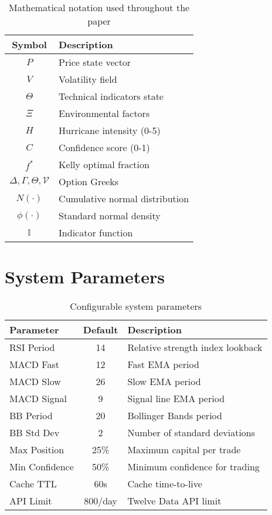 \documentclass[12pt,a4paper]{article}
\begin{document}
\begin{table}[H]
\centering
\begin{tabular}{|c|l|}
\hline
\textbf{Symbol} & \textbf{Description} \\
\hline
$P$ & Price state vector \\
$V$ & Volatility field \\
$\Theta$ & Technical indicators state \\
$\Xi$ & Environmental factors \\
$H$ & Hurricane intensity (0-5) \\
$C$ & Confidence score (0-1) \\
$f^*$ & Kelly optimal fraction \\
$\Delta, \Gamma, \Theta, \mathcal{V}$ & Option Greeks \\
$N(\cdot)$ & Cumulative normal distribution \\
$\phi(\cdot)$ & Standard normal density \\
$\mathbb{I}$ & Indicator function \\
\hline
\end{tabular}
\caption{Mathematical notation used throughout the paper}
\end{table}

\section{System Parameters}

\begin{table}[H]
\centering
\begin{tabular}{|l|c|l|}
\hline
\textbf{Parameter} & \textbf{Default} & \textbf{Description} \\
\hline
RSI Period & 14 & Relative strength index lookback \\
MACD Fast & 12 & Fast EMA period \\
MACD Slow & 26 & Slow EMA period \\
MACD Signal & 9 & Signal line EMA period \\
BB Period & 20 & Bollinger Bands period \\
BB Std Dev & 2 & Number of standard deviations \\
Max Position & 25\% & Maximum capital per trade \\
Min Confidence & 50\% & Minimum confidence for trading \\
Cache TTL & 60s & Cache time-to-live \\
API Limit & 800/day & Twelve Data API limit \\
\hline
\end{tabular}
\caption{Configurable system parameters}
\end{table}
\end{document}

